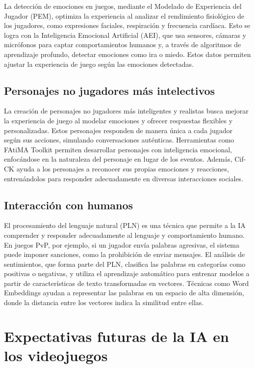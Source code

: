 \documentclass{article}
\begin{document}
La detección de emociones en juegos, mediante el Modelado de Experiencia del Jugador (PEM), optimiza la experiencia al analizar el rendimiento fisiológico de los jugadores, como expresiones faciales, respiración y frecuencia cardíaca. Esto se logra con la Inteligencia Emocional Artificial (AEI), que usa sensores, cámaras y micrófonos para captar comportamientos humanos y, a través de algoritmos de aprendizaje profundo, detectar emociones como ira o miedo. Estos datos permiten ajustar la experiencia de juego según las emociones detectadas.


\subsection{Personajes no jugadores más intelectivos}
La creación de personajes no jugadores más inteligentes y realistas busca mejorar la experiencia de juego al modelar emociones y ofrecer respuestas flexibles y personalizadas. Estos personajes responden de manera única a cada jugador según sus acciones, simulando conversaciones auténticas. Herramientas como FAtiMA Toolkit permiten desarrollar personajes con inteligencia emocional, enfocándose en la naturaleza del personaje en lugar de los eventos. Además, Cif-CK ayuda a los personajes a reconocer sus propias emociones y reacciones, entrenándolos para responder adecuadamente en diversas interacciones sociales.


\subsection{Interacción con humanos}
El procesamiento del lenguaje natural (PLN) es una técnica que permite a la IA comprender y responder adecuadamente al lenguaje y comportamiento humano. En juegos PvP, por ejemplo, si un jugador envía palabras agresivas, el sistema puede imponer sanciones, como la prohibición de enviar mensajes. El análisis de sentimientos, que forma parte del PLN, clasifica las palabras en categorías como positivas o negativas, y utiliza el aprendizaje automático para entrenar modelos a partir de características de texto transformadas en vectores. Técnicas como Word Embeddings ayudan a representar las palabras en un espacio de alta dimensión, donde la distancia entre los vectores indica la similitud entre ellas.


\section{Expectativas futuras de la IA en los videojuegos}
\end{document}
